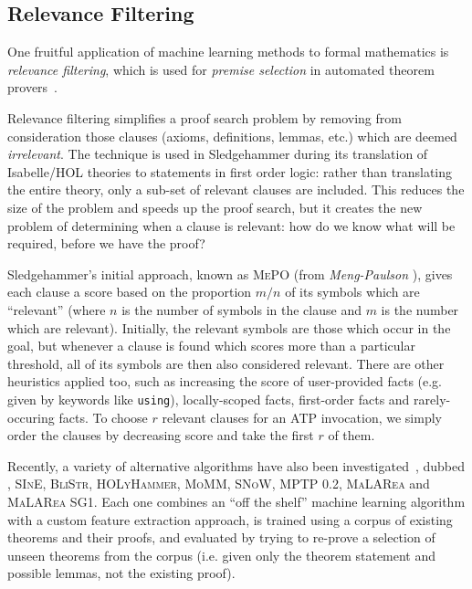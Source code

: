 \subsection{Relevance Filtering}
\label{sec:relevance}

One fruitful application of machine learning methods to formal mathematics is
\emph{relevance filtering}, which is used for \emph{premise selection} in
automated theorem provers~\cite{kuhlwein2012overview}.

Relevance filtering simplifies a proof search problem by removing from
consideration those clauses (axioms, definitions, lemmas, etc.) which are deemed
\emph{irrelevant}. The technique is used in Sledgehammer during its translation
of Isabelle/HOL theories to statements in first order logic: rather than
translating the entire theory, only a sub-set of relevant clauses are
included. This reduces the size of the problem and speeds up the proof search,
but it creates the new problem of determining when a clause is relevant: how do
we know what will be required, before we have the proof?

Sledgehammer's initial approach, known as \textsc{MePO} (from
\emph{Meng-Paulson} \cite{meng2009lightweight}), gives each clause a score based
on the proportion $m / n$ of its symbols which are ``relevant'' (where $n$ is
the number of symbols in the clause and $m$ is the number which are relevant).
Initially, the relevant symbols are those which occur in the goal, but whenever
a clause is found which scores more than a particular threshold, all of its
symbols are then also considered relevant. There are other heuristics applied
too, such as increasing the score of user-provided facts (e.g. given by keywords
like \texttt{using}), locally-scoped facts, first-order facts and
rarely-occuring facts. To choose $r$ relevant clauses for an ATP invocation, we
simply order the clauses by decreasing score and take the first $r$ of them.

Recently, a variety of alternative algorithms have also been
investigated~\cite{kuhlwein2013mash,hoder2011sine,urban2013blistr},
dubbed , \textsc{SInE}, \textsc{BliStr}, \textsc{HOLyHammer},
\textsc{MoMM}, \textsc{SNoW}, \textsc{MPTP 0.2}, \textsc{MaLARea} and
\textsc{MaLARea SG1}. Each one combines an ``off the shelf'' machine learning
algorithm with a custom feature extraction approach, is trained using a corpus
of existing theorems and their proofs, and evaluated by trying to re-prove a
selection of unseen theorems from the corpus (i.e. given only the theorem
statement and possible lemmas, not the existing proof).


